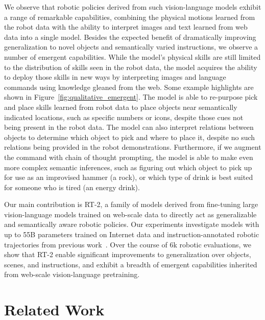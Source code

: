 \documentclass[11pt, a4paper, logo, copyright]{deepmind}
\newcommand{\methodname}{RT-2\xspace}
\begin{document}
We observe that robotic policies derived from such vision-language models exhibit a range of remarkable capabilities, combining the physical motions learned from the robot data with the ability to interpret images and text learned from web data into a single model. 
Besides the expected benefit of dramatically improving generalization to novel objects and semantically varied instructions, we observe a number of emergent capabilities. While the model's physical skills are still limited to the distribution of skills seen in the robot data, the model acquires the ability to deploy those skills in new ways by interpreting images and language commands using knowledge gleaned from the web. 
Some example highlights are shown in Figure~\ref{fig:qualitative_emergent}. The model is able to re-purpose pick and place skills learned from robot data to place objects near semantically indicated locations, such as specific numbers or icons, despite those cues not being present in the robot data. The model can also interpret relations between objects to determine which object to pick and where to place it, despite no such relations being provided in the robot demonstrations. Furthermore, if we augment the command with chain of thought prompting, the model is able to make even more complex semantic inferences, such as figuring out which object to pick up for use as an improvised hammer (a rock), or which type of drink is best suited for someone who is tired (an energy drink).

Our main contribution is \methodname, a family of models derived from fine-tuning  large vision-language models trained on web-scale data to directly act as generalizable and semantically aware robotic policies. Our experiments investigate models with up to 55B parameters trained on Internet data and  instruction-annotated robotic trajectories from previous work~\citep{brohan2022rt}. Over the course of 6k robotic evaluations, we show that \methodname enable significant improvements to generalization over objects, scenes, and instructions, and exhibit a breadth of emergent capabilities inherited from web-scale vision-language pretraining.

\section{Related Work}
\label{sec:rw}
\end{document}
